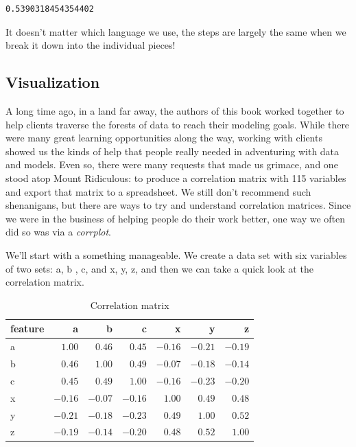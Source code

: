 \documentclass[
  letterpaper,
]{krantz}
\begin{document}
\begin{verbatim}
0.5390318454354402
\end{verbatim}

It doesn't matter which language we use, the steps are largely the same
when we break it down into the individual pieces!

\subsection*{Visualization}\label{visualization}

A long time ago, in a land far away, the authors of this book worked
together to help clients traverse the forests of data to reach their
modeling goals. While there were many great learning opportunities along
the way, working with clients showed us the kinds of help that people
really needed in adventuring with data and models. Even so, there were
many requests that made us grimace, and one stood atop Mount Ridiculous:
to produce a correlation matrix with 115 variables and export that
matrix to a spreadsheet. We still don't recommend such shenanigans, but
there are ways to try and understand correlation matrices. Since we were
in the business of helping people do their work better, one way we often
did so was via a \emph{corrplot}.

We'll start with a something manageable. We create a data set with six
variables of two sets: a, b , c, and x, y, z, and then we can take a
quick look at the correlation matrix.

\begin{longtable}{lrrrrrr}
\caption{Correlation matrix}\tabularnewline

\toprule
feature & a & b & c & x & y & z \\ 
\midrule\addlinespace[2.5pt]
a & $1.00$ & $0.46$ & $0.45$ & $-0.16$ & $-0.21$ & $-0.19$ \\ 
b & $0.46$ & $1.00$ & $0.49$ & $-0.07$ & $-0.18$ & $-0.14$ \\ 
c & $0.45$ & $0.49$ & $1.00$ & $-0.16$ & $-0.23$ & $-0.20$ \\ 
x & $-0.16$ & $-0.07$ & $-0.16$ & $1.00$ & $0.49$ & $0.48$ \\ 
y & $-0.21$ & $-0.18$ & $-0.23$ & $0.49$ & $1.00$ & $0.52$ \\ 
z & $-0.19$ & $-0.14$ & $-0.20$ & $0.48$ & $0.52$ & $1.00$ \\ 
\bottomrule
\end{longtable}
\end{document}
